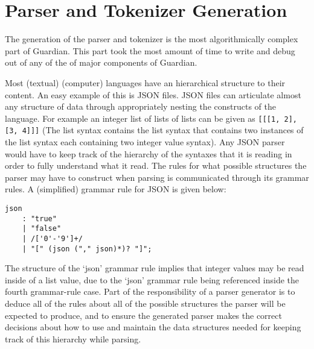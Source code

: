 
\section{Parser and Tokenizer Generation}
{
	The generation of the parser and tokenizer is the most
		algorithmically complex part of Guardian.
		This part took the most amount of time to write
		and debug out of any of the of major components of Guardian.
	
	Most (textual) (computer) languages have an hierarchical structure to
		their content. An easy example of this is JSON files. JSON files
		can articulate almost any structure of data through appropriately
		nesting the constructs of the language. For example an
		integer list of lists of lists can be
		given as \texttt{[[[1, 2], [3, 4]]]} (The list syntax contains the list
		syntax that contains two instances of the list syntax each containing two
		integer value syntax). Any JSON parser would have to
		keep track of the hierarchy of the syntaxes that it is reading
		in order to fully
		understand what it read. The rules for what possible structures the
		parser may have to construct when parsing is communicated
		through its grammar rules. A (simplified) grammar rule for
		JSON is given below:
\begin{lstlisting}[texcl=true, language=MAIA]
json
	: "true"
	| "false"
	| /['0'-'9']+/
	| "[" (json ("," json)*)? "]";
\end{lstlisting}
		The structure of the `json' grammar rule implies that integer values
		may be read inside of a list value, due to the `json' grammar rule
		being referenced inside the fourth grammar-rule case.
		Part of the responsibility of a parser generator is to deduce all of the
		rules about all of the possible structures the parser will be expected
		to produce, and to ensure the generated parser
		makes the correct decisions about how to use and maintain the data
		structures needed for keeping track of this hierarchy while parsing.
	
}
